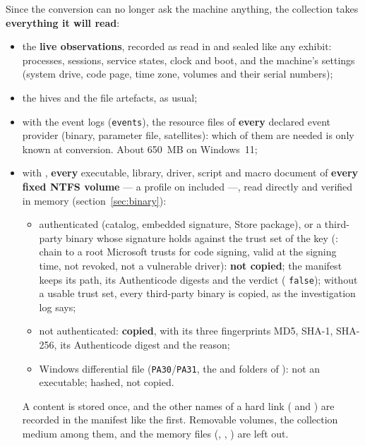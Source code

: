 \documentclass[11pt,a4paper,oneside]{report}
\begin{document}
Since the conversion can no longer ask the machine anything, the collection
takes \textbf{everything it will read}:
\begin{itemize}
  \item the \textbf{live observations}, recorded as read in
         and sealed like any exhibit:
        processes, sessions, service states, clock and boot, and the machine's
        settings (system drive, code page, time zone, volumes and their serial
        numbers);
  \item the hives and the file artefacts, as usual;
  \item with the event logs (\texttt{events}), the resource files of \textbf{every} declared event
        provider (binary, parameter file,  satellites): which of
        them are needed is only known at conversion. About 650~MB on
        Windows~11;
  \item with , \textbf{every} executable, library, driver, script
        and macro document of \textbf{every fixed NTFS volume} — a profile on
         included —, read directly and verified in memory
        (section~\ref{sec:binary}):
        \begin{itemize}
          \item authenticated (catalog, embedded signature, Store package), or a
                third-party binary whose signature holds against the trust set of
                the key (: chain to a root Microsoft trusts for
                code signing, valid at the signing time, not revoked, not a
                vulnerable driver): \textbf{not copied}; the manifest keeps its
                path, its Authenticode digests and the verdict
                ( \texttt{false}); without a usable trust
                set, every third-party binary is copied, as the investigation log
                says;
          \item not authenticated: \textbf{copied}, with its three fingerprints
                MD5, SHA-1, SHA-256, its Authenticode digest and the reason;
          \item Windows differential file (\texttt{PA30}/\texttt{PA31}, the
                 and  folders of ): not an
                executable; hashed, not copied.
        \end{itemize}
        A content is stored once, and the other names of a hard link
        ( and ) are recorded in the manifest
        like the first. Removable volumes, the collection medium among them,
        and the memory files (, ,
        ) are left out.
\end{itemize}
\end{document}
